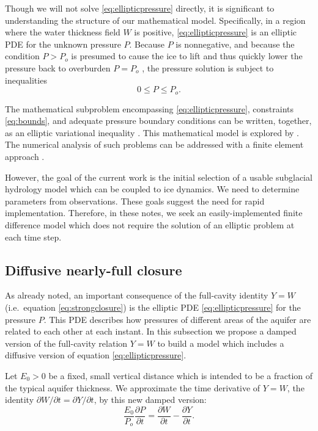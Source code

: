 \documentclass[11pt,final]{amsart}%
\begin{document}
Though we will not solve \eqref{eq:ellipticpressure} directly, it is significant to understanding the structure of our mathematical model.  Specifically, in a region where the water thickness field $W$ is positive, \eqref{eq:ellipticpressure} is an elliptic PDE for the unknown pressure $P$.  Because $P$ is nonnegative, and because the condition $P>P_o$ is presumed to cause the ice to lift and thus quickly lower the pressure back to overburden $P=P_o$ \citep{Schoofetal2012}, the pressure solution is subject to inequalities
\begin{equation}
0 \le P \le P_o. \label{eq:bounds}
\end{equation}

The mathematical subproblem encompassing \eqref{eq:ellipticpressure}, constraints \eqref{eq:bounds}, and adequate pressure boundary conditions can be written, together, as an elliptic variational inequality \citep{KinderlehrerStampacchia}.  This mathematical model is explored by \cite{Schoofetal2012}.  The numerical analysis of such problems can be addressed with a finite element approach \citep[e.g.][]{SchoofStream,JouvetBueler2012}.

However, the goal of the current work is the initial selection of a usable subglacial hydrology model which can be coupled to ice dynamics.  We need to determine parameters from observations.  These goals suggest the need for rapid implementation.  Therefore, in these notes, we seek an easily-implemented finite difference model which does not require the solution of an elliptic problem at each time step.

\subsection*{Diffusive nearly-full closure}  As already noted, an important consequence of the full-cavity identity $Y=W$ (i.e.~equation \eqref{eq:strongclosure}) is the elliptic PDE \eqref{eq:ellipticpressure} for the pressure $P$.  This PDE describes how pressures of different areas of the aquifer are related to each other at each instant.  In this subsection we propose a damped version of the full-cavity relation $Y=W$ to build a model which includes a diffusive version of equation \eqref{eq:ellipticpressure}.

Let $E_0>0$ be a fixed, small vertical distance which is intended to be a fraction of the typical aquifer thickness.  We approximate the time derivative of $Y=W$, the identity $\partial W/\partial t = \partial Y/\partial t$, by this new damped version:
\begin{equation}
\frac{E_0}{P_o} \frac{\partial P}{\partial t} =  \frac{\partial W}{\partial t}  - \frac{\partial Y}{\partial t}.\label{eq:dampeddstrong}
\end{equation}
\end{document}
